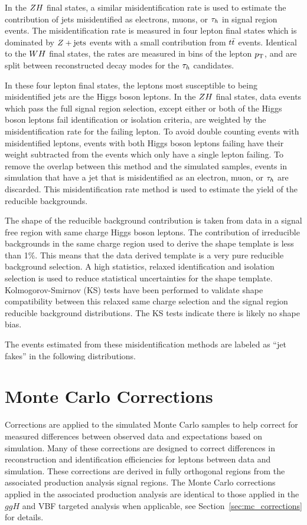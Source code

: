 In the $ZH$ final states, a similar misidentification rate is used
to estimate the contribution of jets misidentified as electrons, muons, or $\tau_{h}$
in signal region events. The misidentification rate is measured in four lepton final states which
is dominated by $Z+\textrm{jets}$ events with a small contribution from 
$t\bar{t}$ events. Identical to the $WH$ final states, the rates are measured 
in bins of the lepton $p_\mathrm{T}$, and are split between reconstructed decay modes for 
the $\tau_{h}$ candidates.

In these four lepton final states, the leptons most susceptible 
to being misidentified jets are the Higgs boson leptons.
In the $ZH$ final states, data events which pass the full
signal region selection, except either or both of the Higgs boson leptons 
fail identification or isolation criteria, are weighted by the misidentification
rate for the failing lepton.
To avoid double counting events with misidentified leptons, 
events with both Higgs boson leptons failing have their weight
subtracted from the events which only have a single lepton failing. 
To remove the overlap between this method and the simulated samples, events in simulation that have a jet that is 
misidentified as an electron, muon, or $\tau_{h}$ are discarded.
This misidentification rate method is used to estimate the yield of the reducible
backgrounds.

The shape of the reducible background contribution is taken from
data in a signal free region with same charge Higgs boson leptons. The
contribution of irreducible backgrounds in the same charge region used to 
derive the shape template is less than 1\%. This means that the data derived template is
a very pure reducible background selection.
A high statistics, relaxed identification and isolation selection is used to reduce
statistical uncertainties for the shape template. Kolmogorov-Smirnov (KS) tests have been performed to validate
shape compatibility between this relaxed same charge selection and the signal region
reducible background distributions. The KS tests indicate there is likely no
shape bias.

The events estimated from these misidentification methods are labeled
as ``jet fakes'' in the following distributions.



\section{Monte Carlo Corrections}
\label{sec:vh_mc_corrections}
Corrections are applied to the simulated Monte Carlo samples to help correct for measured differences
between observed data and expectations based on simulation. Many of these corrections are designed
to correct differences in reconstruction and identification efficiencies for leptons between data
and simulation. These corrections are derived in
fully orthogonal regions from the associated production analysis signal regions.
The Monte Carlo corrections applied in the associated production analysis are identical to those
applied in the $ggH$ and VBF targeted analysis when applicable, see 
Section~\ref{sec:mc_corrections} for details.



